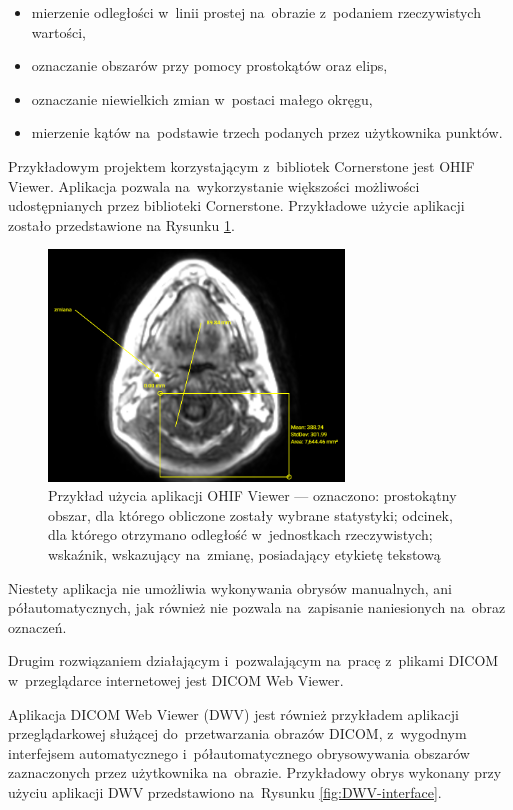 \documentclass[a4paper,11pt,twoside,openright]{report}
\theoremstyle{definition}
\begin{document}
\begin{itemize}[noitemsep]
\item mierzenie odległości w~linii prostej na~obrazie z~podaniem rzeczywistych wartości,
\item oznaczanie obszarów przy pomocy prostokątów oraz elips,
\item oznaczanie niewielkich zmian w~postaci małego okręgu,
\item mierzenie kątów na~podstawie trzech podanych przez użytkownika punktów.
\end{itemize}

Przykładowym projektem korzystającym z~bibliotek Cornerstone jest OHIF Viewer.
Aplikacja pozwala na~wykorzystanie większości możliwości udostępnianych przez
biblioteki Cornerstone. Przykładowe użycie aplikacji zostało przedstawione na
Rysunku \ref{fig:OHIF-example}.

\begin{figure}[tbh!]
	\center
	\includegraphics[width=0.7\textwidth]{OHIF-example}
	\caption{Przykład użycia aplikacji OHIF Viewer --- oznaczono: prostokątny obszar,
	dla którego obliczone zostały wybrane statystyki; odcinek, dla którego otrzymano
	odległość w~jednostkach rzeczywistych; wskaźnik, wskazujący na~zmianę, posiadający
	etykietę tekstową}
    	\label{fig:OHIF-example}
\end{figure}

Niestety aplikacja nie umożliwia wykonywania obrysów manualnych, ani półautomatycznych,
jak również nie pozwala na~zapisanie naniesionych na~obraz oznaczeń.

Drugim rozwiązaniem działającym i~pozwalającym na~pracę z~plikami DICOM w~przeglądarce
internetowej jest DICOM Web Viewer.

Aplikacja DICOM Web Viewer (DWV) \cite{DWV} jest również przykładem aplikacji
przeglądarkowej służącej do~przetwarzania obrazów DICOM, z~wygodnym interfejsem
automatycznego i~półautomatycznego obrysowywania obszarów zaznaczonych
przez użytkownika na~obrazie. Przykładowy obrys wykonany przy użyciu aplikacji
DWV przedstawiono na~Rysunku \ref{fig:DWV-interface}.
\end{document}
